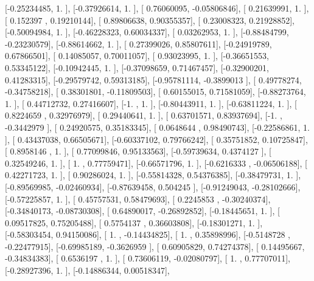 \documentclass{article}
\begin{document}
       [-0.25234485,  1.        ],
       [-0.37926614,  1.        ],
       [ 0.76060095, -0.05806846],
       [ 0.21639991,  1.        ],
       [ 0.152397  ,  0.19210144],
       [ 0.89806638,  0.90355357],
       [ 0.23008323,  0.21928852],
       [-0.50094984,  1.        ],
       [-0.46228323,  0.60034337],
       [ 0.03262953,  1.        ],
       [-0.88484799, -0.23230579],
       [-0.88614662,  1.        ],
       [ 0.27399026,  0.85807611],
       [-0.24919789,  0.67866501],
       [ 0.14085057,  0.70011057],
       [ 0.93023995,  1.        ],
       [-0.36651553,  0.53345122],
       [-0.10942445,  1.        ],
       [-0.37098659,  0.71467457],
       [-0.32900201,  0.41283315],
       [-0.29579742,  0.59313185],
       [-0.95781114, -0.3899013 ],
       [ 0.49778274, -0.34758218],
       [ 0.38301801, -0.11809503],
       [ 0.60155015,  0.71581059],
       [-0.88273764,  1.        ],
       [ 0.44712732,  0.27416607],
       [-1.        ,  1.        ],
       [-0.80443911,  1.        ],
       [-0.63811224,  1.        ],
       [ 0.8224659 ,  0.32976979],
       [ 0.29440641,  1.        ],
       [ 0.63701571,  0.83937694],
       [-1.        , -0.3442979 ],
       [ 0.24920575,  0.35183345],
       [ 0.0648644 ,  0.98490743],
       [-0.22586861,  1.        ],
       [ 0.43437038,  0.66505671],
       [-0.60337102,  0.79766242],
       [ 0.35751852,  0.10725847],
       [ 0.8958146 ,  1.        ],
       [ 0.77099846,  0.95133563],
       [-0.59739634,  0.4374127 ],
       [ 0.32549246,  1.        ],
       [ 1.        ,  0.77759471],
       [-0.66571796,  1.        ],
       [-0.6216333 , -0.06506188],
       [ 0.42271723,  1.        ],
       [ 0.90286024,  1.        ],
       [-0.55814328,  0.54376385],
       [-0.38479731,  1.        ],
       [-0.89569985, -0.02460934],
       [-0.87639458,  0.504245  ],
       [-0.91249043, -0.28102666],
       [-0.57225857,  1.        ],
       [ 0.45757531,  0.58479693],
       [ 0.2245853 , -0.30240374],
       [-0.34840173, -0.08730308],
       [ 0.64890017, -0.26892852],
       [-0.18445651,  1.        ],
       [ 0.09517825,  0.75205488],
       [ 0.5754137 ,  0.36603808],
       [-0.18301271,  1.        ],
       [-0.58303454,  0.94150086],
       [ 1.        , -0.14434825],
       [ 1.        ,  0.35898996],
       [-0.5148728 , -0.22477915],
       [-0.69985189, -0.3626959 ],
       [ 0.60905829,  0.74274378],
       [ 0.14495667, -0.34834383],
       [ 0.6536197 ,  1.        ],
       [ 0.73606119, -0.02080797],
       [ 1.        ,  0.77707011],
       [-0.28927396,  1.        ],
       [-0.14886344,  0.00518347],
\end{document}
